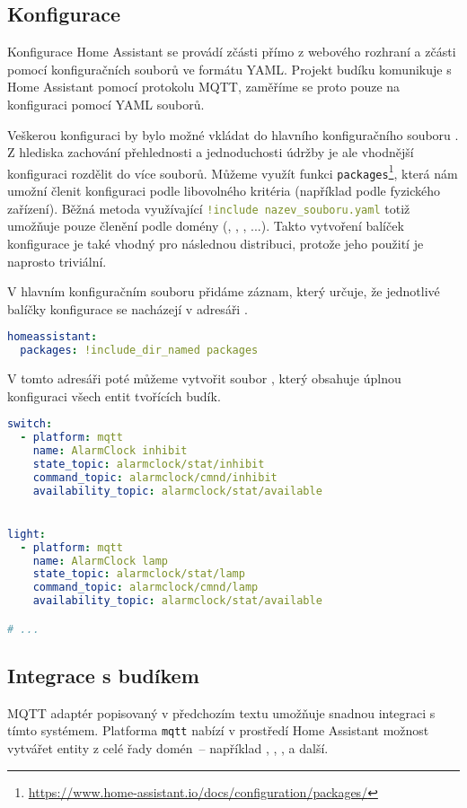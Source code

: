 \subsection{Konfigurace}
Konfigurace Home Assistant se provádí zčásti přímo z webového rozhraní a zčásti
pomocí konfiguračních souborů ve formátu YAML. Projekt budíku komunikuje s Home
Assistant pomocí protokolu MQTT, zaměříme se proto pouze na konfiguraci pomocí
YAML souborů.

Veškerou konfiguraci by bylo možné vkládat do hlavního konfiguračního souboru
.
Z hlediska zachování přehlednosti a jednoduchosti údržby je ale vhodnější
konfiguraci rozdělit do více souborů.
Můžeme využít funkci
\texttt{packages}\footnote{\url{https://www.home-assistant.io/docs/configuration/packages/}},
která nám umožní členit konfiguraci podle libovolného kritéria (například podle
fyzického zařízení). Běžná metoda využívající
\lstinline[language=yaml]|!include nazev_souboru.yaml| totiž umožňuje pouze
členění podle domény (, ,
, ...). Takto vytvoření balíček konfigurace je také vhodný pro
následnou distribuci, protože jeho použití je naprosto triviální.

V hlavním konfiguračním souboru  přidáme záznam,
který určuje, že jednotlivé balíčky konfigurace se nacházejí v adresáři
.
\begin{lstlisting}[language=yaml]
homeassistant:
  packages: !include_dir_named packages
\end{lstlisting}
V tomto adresáři poté můžeme vytvořit soubor
, který obsahuje úplnou konfiguraci všech
entit tvořících budík.
\begin{lstlisting}[language=yaml]
switch:
  - platform: mqtt
    name: AlarmClock inhibit
    state_topic: alarmclock/stat/inhibit
    command_topic: alarmclock/cmnd/inhibit
    availability_topic: alarmclock/stat/available


light:
  - platform: mqtt
    name: AlarmClock lamp
    state_topic: alarmclock/stat/lamp
    command_topic: alarmclock/cmnd/lamp
    availability_topic: alarmclock/stat/available

# ...
\end{lstlisting}



\subsection{Integrace s budíkem}
MQTT adaptér  popisovaný v předchozím textu
umožňuje snadnou integraci s tímto systémem. Platforma \texttt{mqtt} nabízí
v prostředí Home Assistant možnost vytvářet entity z celé řady domén~--
například , , ,
 a další.

